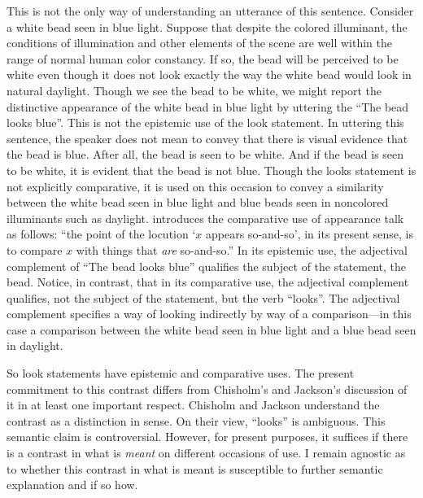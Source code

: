 \documentclass[12pt]{article}
\begin{document}
This is not the only way of understanding an utterance of this sentence. Consider a white bead seen in blue light. Suppose that despite the colored illuminant, the conditions of illumination and other elements of the scene are well within the range of normal human color constancy. If so, the bead will be perceived to be white even though it does not look exactly the way the white bead would look in natural daylight. Though we see the bead to be white, we might report the distinctive appearance of the white bead in blue light by uttering the ``The bead looks blue''. This is not the epistemic use of the look statement. In uttering this sentence, the speaker does not mean to convey that there is visual evidence that the bead is blue. After all, the bead is seen to be white. And if the bead is seen to be white, it is evident that the bead is not blue. Though the looks statement is not explicitly comparative, it is used on this occasion to convey a similarity between the white bead seen in blue light and blue beads seen in noncolored illuminants such as daylight. \citet[45]{Chisholm:1957dq} introduces the comparative use of appearance talk as follows: ``the point of the locution `\( x \) appears so-and-so', in its present sense, is to compare \( x \) with things that \emph{are} so-and-so.'' In its epistemic use, the adjectival complement of ``The bead looks blue'' qualifies the subject of the statement, the bead. Notice, in contrast, that in its comparative use, the adjectival complement qualifies, not the subject of the statement, but the verb ``looks''. The adjectival complement specifies a way of looking indirectly by way of a comparison---in this case a comparison between the white bead seen in blue light and a blue bead seen in daylight.

So look statements have epistemic and comparative uses. The present commitment to this contrast differs from Chisholm's and Jackson's discussion of it in at least one important respect. Chisholm and Jackson understand the contrast as a distinction in sense. On their view, ``looks'' is ambiguous. This semantic claim is controversial. However, for present purposes, it suffices if there is a contrast in what is \emph{meant} on different occasions of use. I remain agnostic as to whether this contrast in what is meant is susceptible to further semantic explanation and if so how. %
\end{document}

